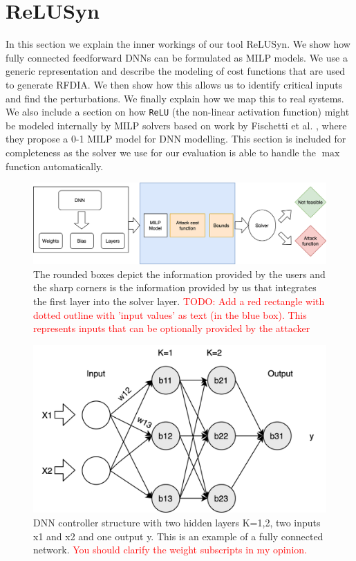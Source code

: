 \chapter{ReLUSyn}
In this section we explain the inner workings of our tool ReLUSyn. 
We show how fully connected feedforward \ac{DNN}s can be formulated as \ac{MILP} models. 
We use a generic representation and describe the modeling of cost functions that are used to generate \ac{RFDIA}.
We then show how this allows us to identify critical inputs and find the perturbations. 
We finally explain how we map this to real systems.
We also include a section on how \texttt{ReLU} (the non-linear activation function) might be modeled internally by MILP solvers based on work by Fischetti et al. \cite{fischetti2017deep}, where they propose a 0-1 MILP model for DNN modelling.
This section is included for completeness as the solver we use for our evaluation is able to handle the $\max$ function automatically.
\begin{figure}
	\centering
	\includegraphics[scale=0.1]{Images/Methodology}
	\caption[Methodology]{The rounded boxes depict the information provided by the users and the sharp corners is the information provided by us that integrates the first layer into the solver layer. \textcolor{red}{TODO: Add a red rectangle with dotted outline with 'input values' as text (in the blue box). This represents inputs that can be optionally provided by the attacker}}
	\label{fig:methodology}
\end{figure}

\begin{figure}
	\centering
	\includegraphics[width=0.7\linewidth]{Images/DNNstructure}
	\caption[DNN structure]{DNN controller structure with two hidden layers K=1,2, two inputs x1 and x2 and one output y. This is an example of a fully connected network. \textcolor{red}{You should clarify the weight subscripts in my opinion.}}
	\label{fig:dnn-controller}
\end{figure}


